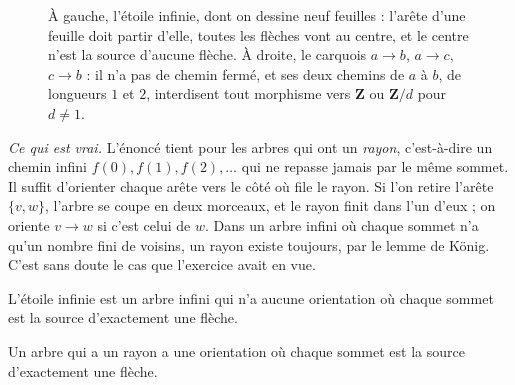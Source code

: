 \begin{figure}[htbp]
\centering
{}
\caption{À gauche, l'étoile infinie, dont on dessine neuf feuilles : l'arête d'une feuille doit partir d'elle, toutes les flèches vont au centre, et le centre n'est la source d'aucune flèche. À droite, le carquois $a \to b$, $a \to c$, $c \to b$ : il n'a pas de chemin fermé, et ses deux chemins de $a$ à $b$, de longueurs $1$ et $2$, interdisent tout morphisme vers $\mathbf Z$ ou $\mathbf Z/d$ pour $d \ne 1$.}
\label{fig:bourbaki-476}
\end{figure}

\emph{Ce qui est vrai.} L'énoncé tient pour les arbres qui ont un \emph{rayon}, c'est-à-dire un chemin infini $f(0), f(1), f(2), \dots$ qui ne repasse jamais par le même sommet. Il suffit d'orienter chaque arête vers le côté où file le rayon. Si l'on retire l'arête $\{v, w\}$, l'arbre se coupe en deux morceaux, et le rayon finit dans l'un d'eux ; on oriente $v \to w$ si c'est celui de $w$. Dans un arbre infini où chaque sommet n'a qu'un nombre fini de voisins, un rayon existe toujours, par le lemme de König. C'est sans doute le cas que l'exercice avait en vue.

\begin{encadre}
\begin{contrexemple}
L'étoile infinie est un arbre infini qui n'a aucune orientation où chaque sommet est la source d'exactement une flèche.
\end{contrexemple}
\begin{enonce}
Un arbre qui a un rayon a une orientation où chaque sommet est la source d'exactement une flèche.
\end{enonce}
\end{encadre}

